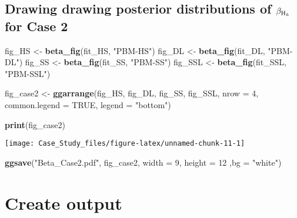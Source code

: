 \documentclass[
]{article}
\newenvironment{Shaded}{\begin{snugshade}}{\end{snugshade}}
\newcommand{\AttributeTok}[1]{\textcolor[rgb]{0.13,0.29,0.53}{#1}}
\newcommand{\ConstantTok}[1]{\textcolor[rgb]{0.56,0.35,0.01}{#1}}
\newcommand{\DecValTok}[1]{\textcolor[rgb]{0.00,0.00,0.81}{#1}}
\newcommand{\FunctionTok}[1]{\textcolor[rgb]{0.13,0.29,0.53}{\textbf{#1}}}
\newcommand{\NormalTok}[1]{#1}
\newcommand{\OtherTok}[1]{\textcolor[rgb]{0.56,0.35,0.01}{#1}}
\newcommand{\StringTok}[1]{\textcolor[rgb]{0.31,0.60,0.02}{#1}}
\begin{document}
\hypertarget{drawing-drawing-posterior-distributions-of-beta_rm-h_k-for-case-2}{%
\subsection{\texorpdfstring{Drawing drawing posterior distributions of
\(\beta_{{\rm H}_k}\) for Case
2}{Drawing drawing posterior distributions of \textbackslash beta\_\{\{\textbackslash rm H\}\_k\} for Case 2}}\label{drawing-drawing-posterior-distributions-of-beta_rm-h_k-for-case-2}}

\begin{Shaded}
\begin{Highlighting}[]
\NormalTok{fig\_HS }\OtherTok{\textless{}{-}} \FunctionTok{beta\_fig}\NormalTok{(fit\_HS, }\StringTok{"PBM{-}HS"}\NormalTok{)}
\NormalTok{fig\_DL }\OtherTok{\textless{}{-}} \FunctionTok{beta\_fig}\NormalTok{(fit\_DL, }\StringTok{"PBM{-}DL"}\NormalTok{)}
\NormalTok{fig\_SS }\OtherTok{\textless{}{-}} \FunctionTok{beta\_fig}\NormalTok{(fit\_SS, }\StringTok{"PBM{-}SS"}\NormalTok{)}
\NormalTok{fig\_SSL }\OtherTok{\textless{}{-}} \FunctionTok{beta\_fig}\NormalTok{(fit\_SSL, }\StringTok{"PBM{-}SSL"}\NormalTok{)}

\NormalTok{fig\_case2 }\OtherTok{\textless{}{-}} \FunctionTok{ggarrange}\NormalTok{(fig\_HS, fig\_DL, fig\_SS, fig\_SSL, }\AttributeTok{nrow =} \DecValTok{4}\NormalTok{, }
                       \AttributeTok{common.legend =} \ConstantTok{TRUE}\NormalTok{, }\AttributeTok{legend =} \StringTok{"bottom"}\NormalTok{)}

\FunctionTok{print}\NormalTok{(fig\_case2)}
\end{Highlighting}
\end{Shaded}

\begin{center}\texttt{[image: Case\_Study\_files/figure-latex/unnamed-chunk-11-1]} \end{center}

\begin{Shaded}
\begin{Highlighting}[]
\FunctionTok{ggsave}\NormalTok{(}\StringTok{"Beta\_Case2.pdf"}\NormalTok{, fig\_case2, }\AttributeTok{width =} \DecValTok{9}\NormalTok{, }\AttributeTok{height =} \DecValTok{12}\NormalTok{ ,}\AttributeTok{bg =} \StringTok{"white"}\NormalTok{)}
\end{Highlighting}
\end{Shaded}

\hypertarget{create-output}{%
\section{Create output}\label{create-output}}
\end{document}
